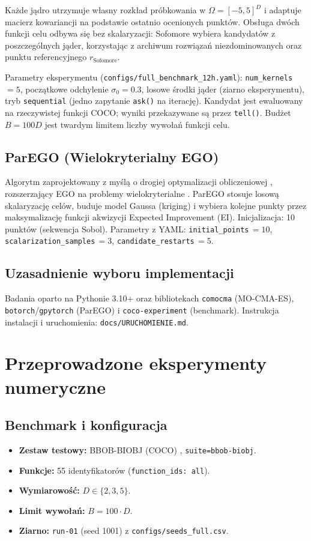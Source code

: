 \documentclass[default]{sn-jnl}
\begin{document}
Każde jądro utrzymuje własny rozkład próbkowania w $\Omega = [-5,5]^D$
i adaptuje macierz kowariancji na podstawie ostatnio ocenionych punktów.
Obsługa dwóch funkcji celu odbywa się bez skalaryzacji: Sofomore wybiera
kandydatów z poszczególnych jąder, korzystając z archiwum rozwiązań
niezdominowanych oraz punktu referencyjnego $r_{\mathrm{Sofomore}}$.

Parametry eksperymentu (\texttt{configs/full\_benchmark\_12h.yaml}):
\texttt{num\_kernels}\,$=5$, początkowe odchylenie $\sigma_0 = 0.3$,
losowe środki jąder (ziarno eksperymentu), tryb \texttt{sequential}
(jedno zapytanie \texttt{ask()} na iterację). Kandydat jest ewaluowany
na rzeczywistej funkcji COCO; wyniki przekazywane są przez \texttt{tell()}.
Budżet $B = 100D$ jest twardym limitem liczby wywołań funkcji celu.

\subsection{ParEGO (Wielokryterialny EGO)}

Algorytm zaprojektowany z myślą o drogiej optymalizacji obliczeniowej
\cite{Jones1998}, rozszerzający EGO na problemy wielokryterialne
\cite{Knowles2006}. ParEGO stosuje losową skalaryzację celów, buduje model
Gaussa (kriging) i wybiera kolejne punkty przez maksymalizację funkcji
akwizycji Expected Improvement (EI). Inicjalizacja: 10 punktów (sekwencja
Sobol). Parametry z YAML: \texttt{initial\_points}\,$=10$,
\texttt{scalarization\_samples}\,$=3$, \texttt{candidate\_restarts}\,$=5$.

\subsection{Uzasadnienie wyboru implementacji}

Badania oparto na Pythonie 3.10+ oraz bibliotekach \texttt{comocma}
(MO-CMA-ES), \texttt{botorch}/\texttt{gpytorch} (ParEGO) i
\texttt{coco-experiment} (benchmark). Instrukcja instalacji i uruchomienia:
\texttt{docs/URUCHOMIENIE.md}.

\section{Przeprowadzone eksperymenty numeryczne}\label{sec:eksperymenty}

\subsection{Benchmark i konfiguracja}
\begin{itemize}[noitemsep]
  \item \textbf{Zestaw testowy:} BBOB-BIOBJ (COCO) \cite{Auger2009}, \texttt{suite=bbob-biobj}.
  \item \textbf{Funkcje:} 55 identyfikatorów (\texttt{function\_ids: all}).
  \item \textbf{Wymiarowość:} $D \in \{2, 3, 5\}$.
  \item \textbf{Limit wywołań:} $B = 100 \cdot D$.
  \item \textbf{Ziarno:} \texttt{run-01} (seed 1001) z \texttt{configs/seeds\_full.csv}.
\end{itemize}
\end{document}

